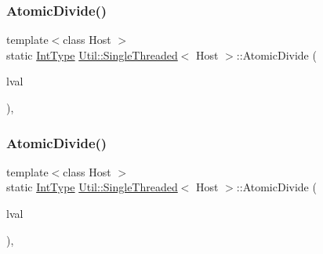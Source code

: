 \mbox{\label{classUtil_1_1SingleThreaded_afb0bc74b0e21b32b31c4895fa22a3337}} 
\subsubsection{\texorpdfstring{AtomicDivide()}{AtomicDivide()}\hspace{0.1cm}{\footnotesize\ttfamily [4/6]}}
{\footnotesize\ttfamily template$<$class Host $>$ \\
static \mbox{\hyperlink{classUtil_1_1SingleThreaded_a35932213fb0c15a7b67ced79bc2af4c6}{Int\+Type}} \mbox{\hyperlink{classUtil_1_1SingleThreaded}{Util\+::\+Single\+Threaded}}$<$ Host $>$\+::Atomic\+Divide (\begin{DoxyParamCaption}\item[{volatile \mbox{\hyperlink{classUtil_1_1SingleThreaded_a35932213fb0c15a7b67ced79bc2af4c6}{Int\+Type}} \&}]{lval }\end{DoxyParamCaption})\hspace{0.3cm}{\ttfamily [inline]}, {\ttfamily [static]}}

\mbox{\label{classUtil_1_1SingleThreaded_afb0bc74b0e21b32b31c4895fa22a3337}} 
\subsubsection{\texorpdfstring{AtomicDivide()}{AtomicDivide()}\hspace{0.1cm}{\footnotesize\ttfamily [5/6]}}
{\footnotesize\ttfamily template$<$class Host $>$ \\
static \mbox{\hyperlink{classUtil_1_1SingleThreaded_a35932213fb0c15a7b67ced79bc2af4c6}{Int\+Type}} \mbox{\hyperlink{classUtil_1_1SingleThreaded}{Util\+::\+Single\+Threaded}}$<$ Host $>$\+::Atomic\+Divide (\begin{DoxyParamCaption}\item[{volatile \mbox{\hyperlink{classUtil_1_1SingleThreaded_a35932213fb0c15a7b67ced79bc2af4c6}{Int\+Type}} \&}]{lval }\end{DoxyParamCaption})\hspace{0.3cm}{\ttfamily [inline]}, {\ttfamily [static]}}

